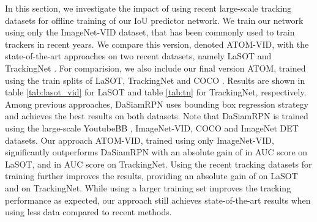 \documentclass[10pt,twocolumn,letterpaper]{article}
\begin{document}
\begin{table}[!t]
	\centering\vspace{-1mm}
	\vspace{1mm}\caption{Comparision of our approach trained using only ImageNet-VID (denoted ATOM-VID) on the TrackingNet dataset.}
	\label{tab:tn}\vspace{-1mm}
\end{table}

In this section, we investigate the impact of using recent large-scale tracking datasets for offline training of our IoU predictor network. We train our network using only the ImageNet-VID \cite{ILSVRC15} dataset, that has been commonly used to train trackers \cite{SiameseFC,Valmadre2017cvpr,RTINet} in recent years. We compare this version, denoted ATOM-VID, with the state-of-the-art approaches on two recent datasets, namely LaSOT \cite{LaSOT} and TrackingNet \cite{TrackingNet}. For comparision, we also include our final version ATOM, trained using the train splits of LaSOT, TrackingNet and COCO \cite{COCO}. Results are shown in table \ref{tab:lasot_vid} for LaSOT and table \ref{tab:tn} for TrackingNet, respectively. Among previous approaches, DaSiamRPN \cite{DaSiamRPN} uses bounding box regression strategy and achieves the best results on both datasets. Note that DaSiamRPN is trained using the large-scale YoutubeBB \cite{YoutubeBB}, ImageNet-VID, COCO and ImageNet DET \cite{ILSVRC15} datasets. Our approach ATOM-VID, trained using only ImageNet-VID, significantly outperforms DaSiamRPN with an absolute gain of  in AUC score on LaSOT, and  in AUC score on TrackingNet. Using the recent tracking datasets for training further improves the results, providing an absolute gain of  on LaSOT and  on TrackingNet. While using a larger training set improves the tracking performance as expected, our approach still achieves state-of-the-art results when using less data compared to recent methods.
\end{document}
